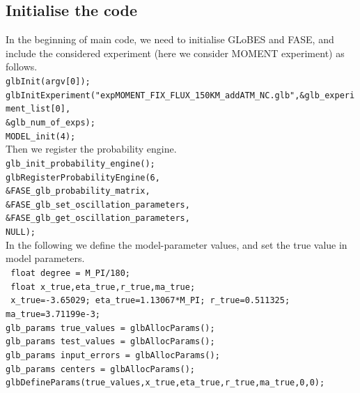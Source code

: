 \documentclass[a4paper,11pt]{article}
\begin{document}
\subsection{Initialise the code}
In the beginning of main code, we need to initialise GLoBES and FASE, and include the considered experiment (here we consider MOMENT experiment) as follows.\vspace{0.2cm}\\ 
\texttt{glbInit(argv[0]);}\\
\texttt{glbInitExperiment("expMOMENT\_FIX\_FLUX\_150KM\_addATM\_NC.glb",\&glb\_experiment\_list[0],}\\
\texttt{\&glb\_num\_of\_exps);}\\
\texttt{MODEL\_init(4);}\vspace{0.2cm}\\
Then we register the probability engine.\vspace{0.2cm}\\
\texttt{glb\_init\_probability\_engine();}\\
\texttt{glbRegisterProbabilityEngine(6,\\
                                 \&FASE\_glb\_probability\_matrix,\\
                                 \&FASE\_glb\_set\_oscillation\_parameters,\\
                                 \&FASE\_glb\_get\_oscillation\_parameters,\\
                                 NULL); }\vspace{0.2cm}\\                                 
In the following we define the model-parameter values, and set the true value in model parameters.\vspace{0.2cm}\\
\texttt{     float degree   = M\_PI/180;}\\
\texttt{     float x\_true,eta\_true,r\_true,ma\_true;}\\
\texttt{    x\_true=-3.65029; eta\_true=1.13067*M\_PI; r\_true=0.511325; ma\_true=3.71199e-3;}\\
%
\texttt{glb\_params true\_values = glbAllocParams();}\\
\texttt{glb\_params test\_values = glbAllocParams();}\\
\texttt{glb\_params input\_errors  = glbAllocParams();}\\
\texttt{glb\_params centers         = glbAllocParams();}\\
\texttt{glbDefineParams(true\_values,x\_true,eta\_true,r\_true,ma\_true,0,0);}\\
\end{document}
